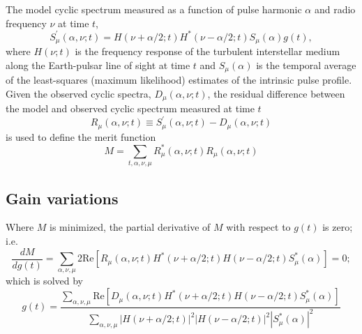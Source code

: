 \documentclass[manuscript]{aastex631}
\begin{document}
The model cyclic spectrum measured as a function of pulse harmonic $\alpha$ and radio frequency $\nu$ at time $t$,
%
\begin{equation}
    S^\prime_\mu(\alpha,\nu;t) = H(\nu+\alpha/2;t) H^*(\nu-\alpha/2;t) S_\mu(\alpha) g(t),
\end{equation}
%
where $H(\nu;t)$ is the frequency response of the turbulent interstellar medium along the Earth-pulsar line of sight at time $t$ and $S_\mu(\alpha)$ is the temporal average of the least-squares (maximum likelihood) estimates of the intrinsic pulse profile.
%
Given the observed cyclic spectra, $D_\mu(\alpha,\nu;t)$, the residual difference between the model and observed cyclic spectrum measured at time $t$
%
\begin{equation}
    R_\mu(\alpha,\nu;t) \equiv S^\prime_\mu(\alpha,\nu;t) - D_\mu(\alpha,\nu;t)
\end{equation}
%
is used to define the merit function
%
\begin{equation}
    M = \sum_{t,\alpha,\nu,\mu} R^*_\mu(\alpha,\nu;t) R_\mu(\alpha,\nu;t)
    \label{eqn:merit_function}
\end{equation}
%




\subsection{Gain variations}
\label{sec:gain_variations}

\noindent
Where $M$ is minimized, the partial derivative of $M$ with respect to $g(t)$ is zero; i.e.
\begin{equation}
    \frac{dM}{dg(t)}
    = \sum_{\alpha,\nu,\mu} 2\mathrm{Re} \left[
    R_\mu(\alpha,\nu;t) H^*(\nu+\alpha/2;t) H(\nu-\alpha/2;t) S^*_\mu(\alpha) \right] = 0;
\label{eqn:dM_dg}
\end{equation}
which is solved by
\begin{equation}
g(t) = \frac
{\sum_{\alpha,\nu,\mu} \mathrm{Re} \left[D_\mu(\alpha,\nu;t) H^*(\nu+\alpha/2;t) H(\nu-\alpha/2;t) S^*_\mu(\alpha) \right]}
{\sum_{\alpha,\nu,\mu} |H(\nu+\alpha/2;t)|^2 |H(\nu-\alpha/2;t)|^2 |S^*_\mu(\alpha)|^2 }
\end{equation}


\end{document}
